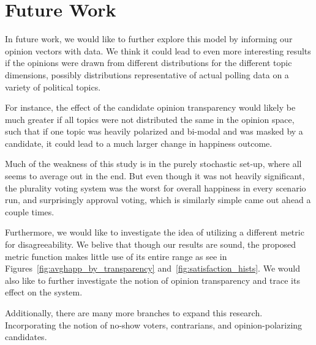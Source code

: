 \section{Future Work}
In future work, we would like to further explore this model by informing our opinion vectors with data.
We think it could lead to even more interesting results if the opinions were drawn from different distributions for the different topic dimensions, possibly distributions representative of actual polling data on a variety of political topics.

For instance, the effect of the candidate opinion transparency would likely be much greater if all topics were not distributed the same in the opinion space, such that if one topic was heavily polarized and bi-modal and was masked by a candidate, it could lead to a much larger change in happiness outcome.

Much of the weakness of this study is in the purely stochastic set-up, where all seems to average out in the end.
But even though it was not heavily significant, the plurality voting system was the worst for overall happiness in every scenario run, and surprisingly approval voting, which is similarly simple came out ahead a couple times.

Furthermore, we would like to investigate the idea of utilizing a different metric for disagreeability. We belive that though our results are sound, the proposed metric function makes little use of its entire range as see in
Figures~\ref{fig:avghapp_by_transparency} and~\ref{fig:satisfaction_hists}. We would also like to further investigate the notion
of opinion transparency and trace its effect on the system.

Additionally, there are many more branches to expand this research. Incorporating the notion of no-show voters, contrarians,
and opinion-polarizing candidates.
